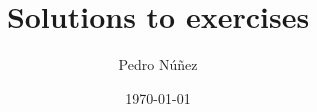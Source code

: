 \documentclass[12pt,a4paper,reqno]{amsart}
\title[Solutions to exercises]{Solutions to exercises}
\author[Pedro N\'{u}\~{n}ez]{Pedro N\'{u}\~{n}ez}\thanks{{\itshape Email:}~\href{mailto:pedro.nunez@math.uni-freiburg.de}{pedro.nunez@math.uni-freiburg.de}. \\ \indent {\itshape Homepage:}~\href{https://home.mathematik.uni-freiburg.de/nunez/?l=en}{https://home.mathematik.uni-freiburg.de/nunez}}
\date{\today}
\theoremstyle{plain}
\theoremstyle{definition}
\theoremstyle{remark}
\begin{document}
\maketitle

\printbibliography
\vfill
\end{document}
